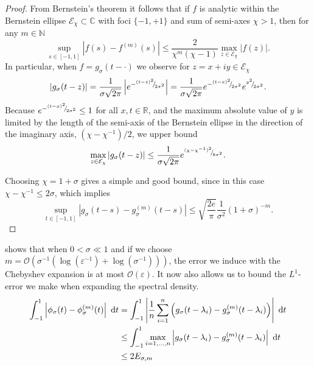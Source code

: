 \begin{proof}
    From Bernstein's theorem \cite[Theorem 4.3]{trefethen-2008-gauss-quadrature} it follows that if $f$ is analytic within the Bernstein ellipse $\mathcal{E}_{\chi} \subset \mathbb{C}$ with foci $\{-1, +1\}$ and sum of semi-axes $\chi > 1$, then for any $m \in \mathbb{N}$
    \begin{equation}
        \sup_{s \in [-1, 1]} \left| f(s) - f^{(m)}(s) \right| \leq \frac{2}{\chi^m (\chi - 1)} \max_{z \in \mathcal{E}_{\chi}} |f(z)|.
        \label{equ:bernstein-bound}
    \end{equation}
    In particular, when $f = g_{\sigma}(t - \cdot)$ we observe for $z = x + iy \in \mathcal{E}_{\chi}$
    \begin{equation}
    | g_{\sigma}(t - z) | 
    = \frac{1}{\sigma \sqrt{2 \pi}} \left| e^{-{}^{(t - z)^2}{\mskip -5mu/\mskip -3mu}_{2\sigma^2}} \right|
    = \frac{1}{\sigma \sqrt{2 \pi}} e^{-{}^{(t - x)^2}{\mskip -5mu/\mskip -3mu}_{2\sigma^2}}e^{{}^{y^2}{\mskip -5mu/\mskip -3mu}_{2\sigma^2}}.
    \end{equation}
    Because $e^{-{}^{(t - x)^2}{\mskip -5mu/\mskip -3mu}_{2\sigma^2}} \leq 1$ for all $x, t \in \mathbb{R}$, and the maximum absolute value of $y$ is limited by the length of the semi-axis of the Bernstein ellipse in the direction of the imaginary axis, $(\chi - \chi^{-1}) / 2$, we upper bound
    \begin{equation}
        \max_{z \in \mathcal{E}_{\chi}} | g_{\sigma}(t - z) | 
        \leq \frac{1}{\sigma \sqrt{2 \pi}} e^{{}^{(\chi - \chi^{-1})^2}{\mskip -5mu/\mskip -3mu}_{8 \sigma^2}}.
    \end{equation}

    Choosing $\chi = 1 + \sigma$ gives a simple and good bound, since in this case $\chi - \chi^{-1} \leq 2\sigma$, which implies
    \begin{equation}
        \sup_{t \in [-1, 1]} \left| g_{\sigma}(t - s) - g_{\sigma}^{(m)}(t - s) \right| \leq \sqrt{\frac{2e}{\pi}} \frac{1}{\sigma^2} (1 + \sigma)^{-m}.
    \end{equation}
\end{proof}

 shows that when $0 < \sigma \ll 1$ and if we choose $m = \mathcal{O}(\sigma^{-1}(\log(\varepsilon^{-1}) + \log(\sigma^{-1})))$, the error we induce with the Chebyshev expansion is at most $\mathcal{O}(\varepsilon)$. It now also allows us to bound the $L^1$-error we make when expanding the spectral density.
\begin{align}
    \int_{-1}^{1} \left| \phi_{\sigma}(t) - \phi_{\sigma}^{(m)}(t) \right|~\mathrm{d}t 
    &= \int_{-1}^{1} \left| \frac{1}{n} \sum_{i=1}^n \left(g_{\sigma}(t - \lambda_i) - g_{\sigma}^{(m)}(t - \lambda_i)\right) \right|~\mathrm{d}t \notag \\
    &\leq \int_{-1}^{1} \max_{i = 1, \dots, n} \left| g_{\sigma}(t - \lambda_i) - g_{\sigma}^{(m)}(t - \lambda_i) \right|~\mathrm{d}t \notag \\
    &\leq 2 E_{\sigma, m}
    \label{equ:chebyshev-interpolation-spectral-density}
\end{align}

